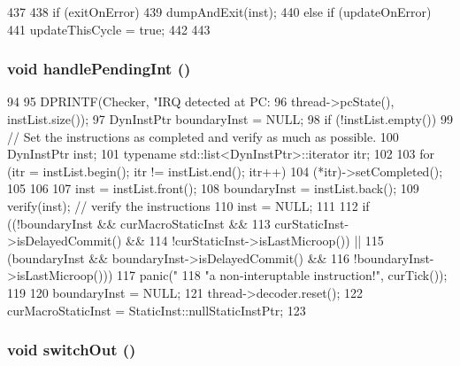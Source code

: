 \begin{DoxyCode}
437     {
438         if (exitOnError) {
439             dumpAndExit(inst);
440         } else if (updateOnError) {
441             updateThisCycle = true;
442         }
443     }
\end{DoxyCode}
\hypertarget{classChecker_a7e1306bfefe8be093795acd567266c94}{
\subsubsection[{handlePendingInt}]{\setlength{\rightskip}{0pt plus 5cm}void handlePendingInt ()}}
\label{classChecker_a7e1306bfefe8be093795acd567266c94}



\begin{DoxyCode}
94 {
95     DPRINTF(Checker, "IRQ detected at PC: %
96                      thread->pcState(), instList.size());
97     DynInstPtr boundaryInst = NULL;
98     if (!instList.empty()) {
99         // Set the instructions as completed and verify as much as possible.
100         DynInstPtr inst;
101         typename std::list<DynInstPtr>::iterator itr;
102 
103         for (itr = instList.begin(); itr != instList.end(); itr++) {
104             (*itr)->setCompleted();
105         }
106 
107         inst = instList.front();
108         boundaryInst = instList.back();
109         verify(inst); // verify the instructions
110         inst = NULL;
111     }
112     if ((!boundaryInst && curMacroStaticInst &&
113           curStaticInst->isDelayedCommit() &&
114           !curStaticInst->isLastMicroop()) ||
115         (boundaryInst && boundaryInst->isDelayedCommit() &&
116          !boundaryInst->isLastMicroop())) {
117         panic("%
118               "a non-interuptable instruction!", curTick());
119     }
120     boundaryInst = NULL;
121     thread->decoder.reset();
122     curMacroStaticInst = StaticInst::nullStaticInstPtr;
123 }
\end{DoxyCode}
\hypertarget{classChecker_a05f299b443f8cc73a93d61572edc0218}{
\subsubsection[{switchOut}]{\setlength{\rightskip}{0pt plus 5cm}void switchOut ()}}
\label{classChecker_a05f299b443f8cc73a93d61572edc0218}



